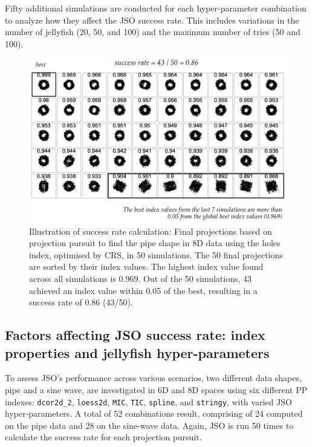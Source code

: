 \documentclass[
  12pt,
]{interact}
\theoremstyle{plain}
\begin{document}
Fifty additional simulations are conducted for each hyper-parameter
combination to analyze how they affect the JSO success rate. This
includes variations in the number of jellyfish (20, 50, and 100) and the
maximum number of tries (50 and 100).

\begin{figure}

{\centering \includegraphics[width=4.52in,height=\textheight]{figures/success-rate.png}

}

\caption{\label{fig-success-rate}Illustration of success rate
calculation: Final projections based on projection pursuit to find the
pipe shape in 8D data using the holes index, optimised by CRS, in 50
simulations. The 50 final projections are sorted by their index values.
The highest index value found across all simulations is 0.969. Out of
the 50 simulations, 43 achieved an index value within 0.05 of the best,
resulting in a success rate of 0.86 (43/50).}

\end{figure}

\hypertarget{sec-app-2}{%
\subsection{Factors affecting JSO success rate: index properties and
jellyfish hyper-parameters}\label{sec-app-2}}

To assess JSO's performance across various scenarios, two different data
shapes, pipe and a sine wave, are investigated in 6D and 8D spaces using
six different PP indexes: \texttt{dcor2d\_2}, \texttt{loess2d},
\texttt{MIC}, \texttt{TIC}, \texttt{spline}, and \texttt{stringy}, with
varied JSO hyper-parameters. A total of 52 combinations result,
comprising of 24 computed on the pipe data and 28 on the sine-wave data.
Again, JSO is run 50 times to calculate the success rate for each
projection pursuit.
\end{document}
